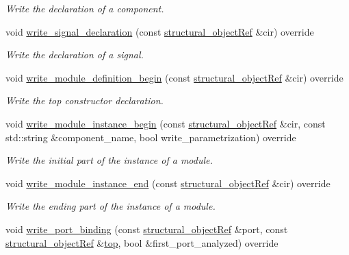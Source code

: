 \begin{DoxyCompactItemize}
\begin{DoxyCompactList}\small\item\em Write the declaration of a component. \end{DoxyCompactList}\item 
void \hyperlink{classverilog__writer_ad10d67870682d947144dac0629560742}{write\+\_\+signal\+\_\+declaration} (const \hyperlink{structural__objects_8hpp_a8ea5f8cc50ab8f4c31e2751074ff60b2}{structural\+\_\+object\+Ref} \&cir) override
\begin{DoxyCompactList}\small\item\em Write the declaration of a signal. \end{DoxyCompactList}\item 
void \hyperlink{classverilog__writer_a8c7225cfbd24b813da3fc7a790ff1e1c}{write\+\_\+module\+\_\+definition\+\_\+begin} (const \hyperlink{structural__objects_8hpp_a8ea5f8cc50ab8f4c31e2751074ff60b2}{structural\+\_\+object\+Ref} \&cir) override
\begin{DoxyCompactList}\small\item\em Write the top constructor declaration. \end{DoxyCompactList}\item 
void \hyperlink{classverilog__writer_a1e0cb32347eba52c36780f6f179dfa6c}{write\+\_\+module\+\_\+instance\+\_\+begin} (const \hyperlink{structural__objects_8hpp_a8ea5f8cc50ab8f4c31e2751074ff60b2}{structural\+\_\+object\+Ref} \&cir, const std\+::string \&component\+\_\+name, bool write\+\_\+parametrization) override
\begin{DoxyCompactList}\small\item\em Write the initial part of the instance of a module. \end{DoxyCompactList}\item 
void \hyperlink{classverilog__writer_ac10a9da13d7ad6c60d862998383a3695}{write\+\_\+module\+\_\+instance\+\_\+end} (const \hyperlink{structural__objects_8hpp_a8ea5f8cc50ab8f4c31e2751074ff60b2}{structural\+\_\+object\+Ref} \&cir) override
\begin{DoxyCompactList}\small\item\em Write the ending part of the instance of a module. \end{DoxyCompactList}\item 
void \hyperlink{classverilog__writer_a6c09eb18456ab75a1086e45ec464cae8}{write\+\_\+port\+\_\+binding} (const \hyperlink{structural__objects_8hpp_a8ea5f8cc50ab8f4c31e2751074ff60b2}{structural\+\_\+object\+Ref} \&port, const \hyperlink{structural__objects_8hpp_a8ea5f8cc50ab8f4c31e2751074ff60b2}{structural\+\_\+object\+Ref} \&\hyperlink{tutorial__pact__2019_2Introduction_2second_2module_8c_a363ff33001bb9810eee7a6a61179583b}{top}, bool \&first\+\_\+port\+\_\+analyzed) override

\end{DoxyCompactItemize}
